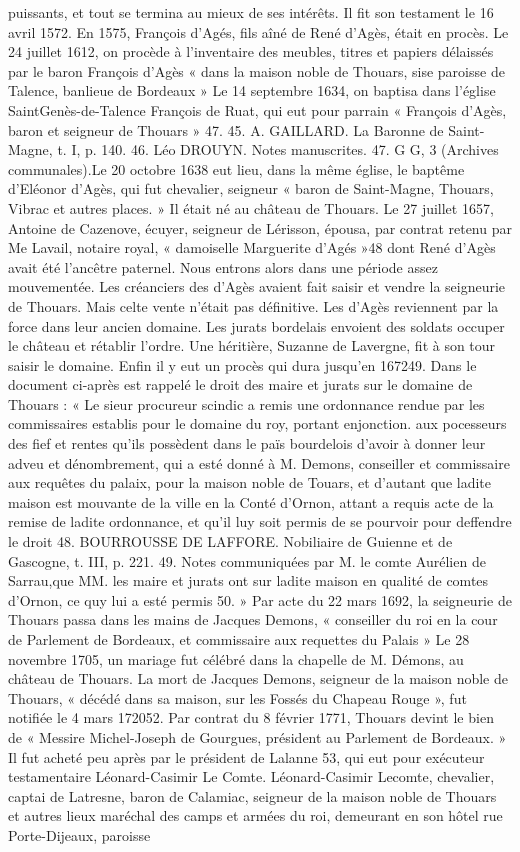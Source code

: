 puissants, et tout se termina au mieux de ses intérêts. Il fit son testament le 16 avril 1572. En 1575, François d'Agés, fils aîné de René d'Agès, était en procès. Le 24 juillet 1612, on procède à l'inventaire des meubles, titres et papiers délaissés par le baron François d'Agès « dans la maison noble de Thouars, sise paroisse de Talence, banlieue de Bordeaux » Le 14 septembre 1634, on baptisa dans l'église SaintGenès-de-Talence François de Ruat, qui eut pour parrain « François d'Agès, baron et seigneur de Thouars » 47. 45. A. GAILLARD. La Baronne de Saint-Magne, t. I, p. 140. 46. Léo DROUYN. Notes manuscrites. 47. G G, 3 (Archives communales).Le 20 octobre 1638 eut lieu, dans la même église, le baptême d'Eléonor d'Agès, qui fut chevalier, seigneur « baron de Saint-Magne, Thouars, Vibrac et autres places. » Il était né au château de Thouars. Le 27 juillet 1657, Antoine de Cazenove, écuyer, seigneur de Lérisson, épousa, par contrat retenu par Me Lavail, notaire royal, « damoiselle Marguerite d'Agés »48 dont René d'Agès avait été l'ancêtre paternel. Nous entrons alors dans une période assez mouvementée. Les créanciers des d'Agès avaient fait saisir et vendre la seigneurie de Thouars. Mais celte vente n'était pas définitive. Les d'Agès reviennent par la force dans leur ancien domaine. Les jurats bordelais envoient des soldats occuper le château et rétablir l'ordre. Une héritière, Suzanne de Lavergne, fit à son tour saisir le domaine. Enfin il y eut un procès qui dura jusqu'en 167249. Dans le document ci-après est rappelé le droit des maire et jurats sur le domaine de Thouars : « Le sieur procureur scindic a remis une ordonnance rendue par les commissaires establis pour le domaine du roy, portant enjonction. aux pocesseurs des fief et rentes qu'ils possèdent dans le païs bourdelois d'avoir à donner leur adveu et dénombrement, qui a esté donné à M. Demons, conseiller et commissaire aux requêtes du palaix, pour la maison noble de Touars, et d'autant que ladite maison est mouvante de la ville en la Conté d'Ornon, attant a requis acte de la remise de ladite ordonnance, et qu'il luy soit permis de se pourvoir pour deffendre le droit 48. BOURROUSSE DE LAFFORE. Nobiliaire de Guienne et de Gascogne, t. III, p. 221. 49. Notes communiquées par M. le comte Aurélien de Sarrau,que MM. les maire et jurats ont sur ladite maison en qualité de comtes d'Ornon, ce quy lui a esté permis 50. » Par acte du 22 mars 1692, la seigneurie de Thouars passa dans les mains de Jacques Demons, « conseiller du roi en la cour de Parlement de Bordeaux, et commissaire aux requettes du Palais » Le 28 novembre 1705, un mariage fut célébré dans la chapelle de M. Démons, au château de Thouars. La mort de Jacques Demons, seigneur de la maison noble de Thouars, « décédé dans sa maison, sur les Fossés du Chapeau Rouge », fut notifiée le 4 mars 172052. Par contrat du 8 février 1771, Thouars devint le bien de « Messire Michel-Joseph de Gourgues, président au Parlement de Bordeaux. » Il fut acheté peu après par le président de Lalanne 53, qui eut pour exécuteur testamentaire Léonard-Casimir Le Comte. Léonard-Casimir Lecomte, chevalier, captai de Latresne, baron de Calamiac, seigneur de la maison noble de Thouars et autres lieux maréchal des camps et armées du roi, demeurant en son hôtel rue Porte-Dijeaux, paroisse 